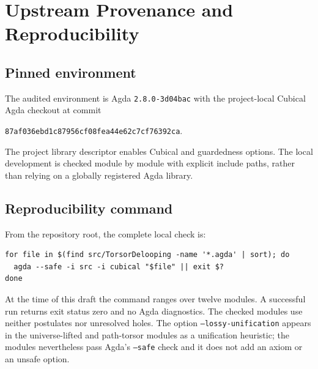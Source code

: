 \section{Upstream Provenance and Reproducibility}
\label{app:provenance}

\subsection{Pinned environment}
The audited environment is Agda \texttt{2.8.0-3d04bac} with the project-local Cubical Agda checkout at commit
\begin{center}
\texttt{87af036ebd1c87956cf08fea44e62c7cf76392ca}.
\end{center}
The project library descriptor enables Cubical and guardedness options. The local development is checked module by module with explicit include paths, rather than relying on a globally registered Agda library.

\subsection{Reproducibility command}
From the repository root, the complete local check is:
{\small\begin{verbatim}
for file in $(find src/TorsorDelooping -name '*.agda' | sort); do
  agda --safe -i src -i cubical "$file" || exit $?
done
\end{verbatim}}
At the time of this draft the command ranges over twelve modules. A successful run returns exit status zero and no Agda diagnostics. The checked modules use neither postulates nor unresolved holes. The option \texttt{--lossy-unification} appears in the universe-lifted and path-torsor modules as a unification heuristic; the modules nevertheless pass Agda's \texttt{--safe} check and it does not add an axiom or an unsafe option.

